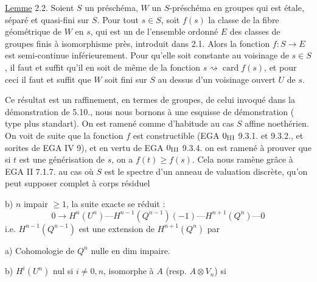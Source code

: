 \uline{Lemme} 2.2. Soient $S$ un préschéma, $W$ un $S$-préschéma en groupes qui est étale,  séparé et quasi-fini sur $S$. Pour tout $s\in S$, soit $f(s)$ la classe de la fibre géométrique de $W$ en $s$, qui est un  de l'ensemble ordonné $E$ des classes de groupes finis à isomorphisme près, introduit dans 2.1. Alors la fonction $f:S\longrightarrow E$ est semi-continue inférieurement. Pour qu'elle soit constante au voisinage de $s\in S$,  il faut et suffit qu'il en soit de même de la fonction $s\rightsquigarrow\operatorname{card}f(s)$, et pour ceci il faut et suffit que $W$ soit fini sur $S$ au dessus d'un voisinage ouvert $U$ de $s$.

Ce résultat est un raffinement, en termes de groupes, de celui invoqué dans la démonstration de  5.10., nous nous bornons à une esquisse de  démonstration ( type  plus standart). On est ramené comme d'habitude au cas $S$ affine noethérien. On voit de suite que la fonction $f$ est constructible (EGA  $0_{\rm III}$ 9.3.1. et 9.3.2., et sorites de EGA IV 9), et en vertu de EGA $0_{\rm III}$ 9.3.4. on est ramené  à prouver que si $t$ est une générisation de $s$, on a $f(t)\geq f(s)$. Cela nous ramène  grâce à EGA II 7.1.7. au cas où $S$ est le spectre d'un anneau de valuation discrète, qu'on peut supposer complet à corps résiduel

b) $n$ impair $\geq1$, la suite exacte se réduit :
\[
0\longrightarrow H^n(U^n)\text{---}H^{n-1}(Q^{n-1})(-1)\text{---}H^{n+1}(Q^n)\text{---}0
\]
i.e. $H^{n-1}(Q^{n-1})$ est une extension de $H^{n+1}(Q^n)$ par

a) Cohomologie de $Q^n$ nulle en dim impaire.

b) $H^i(U^n)$ nul si $i\neq0,n$, isomorphe à $A$ (resp. $A\otimes V_n$) si

